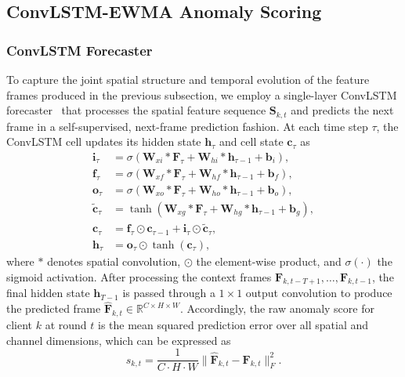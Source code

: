 \documentclass[journal]{IEEEtran}
\begin{document}
\subsection{ConvLSTM-EWMA Anomaly Scoring}

\subsubsection{ConvLSTM Forecaster}
To capture the joint spatial structure and temporal evolution of the feature frames produced in the previous subsection, we employ a single-layer ConvLSTM forecaster~\cite{shi2015convolutional} that processes the spatial feature sequence $\mathbf{S}_{k,t}$ and predicts the next frame in a self-supervised, next-frame prediction fashion. At each time step $\tau$, the ConvLSTM cell updates its hidden state $\mathbf{h}_\tau$ and cell state $\mathbf{c}_\tau$ as
\begin{align}
\mathbf{i}_\tau &= \sigma(\mathbf{W}_{xi} * \mathbf{F}_\tau + \mathbf{W}_{hi} * \mathbf{h}_{\tau-1} + \mathbf{b}_i), \label{eq:lstm_i}\\
\mathbf{f}_\tau &= \sigma(\mathbf{W}_{xf} * \mathbf{F}_\tau + \mathbf{W}_{hf} * \mathbf{h}_{\tau-1} + \mathbf{b}_f), \label{eq:lstm_f}\\
\mathbf{o}_\tau &= \sigma(\mathbf{W}_{xo} * \mathbf{F}_\tau + \mathbf{W}_{ho} * \mathbf{h}_{\tau-1} + \mathbf{b}_o), \label{eq:lstm_o}\\
\tilde{\mathbf{c}}_\tau &= \tanh(\mathbf{W}_{xg} * \mathbf{F}_\tau + \mathbf{W}_{hg} * \mathbf{h}_{\tau-1} + \mathbf{b}_g), \label{eq:lstm_g}\\
\mathbf{c}_\tau &= \mathbf{f}_\tau \odot \mathbf{c}_{\tau-1} + \mathbf{i}_\tau \odot \tilde{\mathbf{c}}_\tau, \label{eq:lstm_c}\\
\mathbf{h}_\tau &= \mathbf{o}_\tau \odot \tanh(\mathbf{c}_\tau), \label{eq:lstm_h}
\end{align}
where $*$ denotes spatial convolution, $\odot$ the element-wise product, and $\sigma(\cdot)$ the sigmoid activation. After processing the context frames $\mathbf{F}_{k,t-T+1}, \ldots, \mathbf{F}_{k,t-1}$, the final hidden state $\mathbf{h}_{T-1}$ is passed through a $1 \times 1$ output convolution to produce the predicted frame $\hat{\mathbf{F}}_{k,t} \in \mathbb{R}^{C \times H \times W}$. Accordingly, the raw anomaly score for client $k$ at round $t$ is the mean squared prediction error over all spatial and channel dimensions, which can be expressed as
\begin{equation}
s_{k,t} = \frac{1}{C \cdot H \cdot W} \|\hat{\mathbf{F}}_{k,t} - \mathbf{F}_{k,t}\|_F^2.
\label{eq:anomaly_score}
\end{equation}
\end{document}
